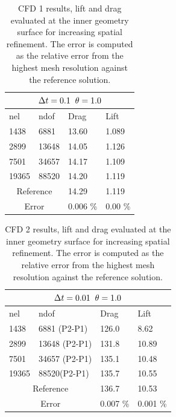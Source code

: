 \begin{table}[h!]
\centering
\label{CFD 1 Results}
\begin{tabular}{ |p{1cm}||p{2.7cm}|p{3.3cm}|p{3.3cm}|}
\hline
  \multicolumn{4}{|c|}{$\Delta t = 0.1 \hspace{2mm} \theta = 1.0$} \\
\hline
nel & ndof & Drag  & Lift \\
\hline
 1438    & 6881   & 13.60 & 1.089  \\
 2899    & 13648  & 14.05 & 1.126 \\
 7501    & 34657  & 14.17   & 1.109 \\
 19365   & 88520  & 14.20 & 1.119 \\
  \hline
  \multicolumn{2}{|c|}{Reference}  & 14.29   & 1.119\\
   \hline
    \multicolumn{2}{|c|}{Error}  & 0.006 \%   & 0.00 \%\\
   \hline
\end{tabular}
\caption{CFD 1 results, lift and drag evaluated at the inner geometry surface for increasing spatial refinement. The error is computed as the relative error from the highest mesh resolution against the reference solution.}
\end{table}

\newpage

\begin{table}[h!]
\centering
\label{CFD-2 Results}
\begin{tabular}{ |p{1cm}||p{2.7cm}|p{3.3cm}|p{3.3cm}|}
 \hline
  \multicolumn{4}{|c|}{$\Delta t = 0.01 \hspace{2mm} \theta = 1.0$} \\
   \hline
nel & ndof & Drag  & Lift \\
\hline
 1438    & 6881 (P2-P1)  & 126.0 &  8.62 \\
 2899    & 13648  (P2-P1)& 131.8 & 10.89  \\
 7501    & 34657 (P2-P1) & 135.1 & 10.48  \\
 19365   & 88520(P2-P1)  & 135.7 & 10.55  \\
 \hline
  \multicolumn{2}{|c|}{Reference}  & 136.7   & 10.53\\
   \hline
    \multicolumn{2}{|c|}{Error}  & 0.007 \%   & 0.001 \%\\
   \hline
\end{tabular}
\caption{CFD 2 results, lift and drag evaluated at the inner geometry surface for increasing spatial refinement. The error is computed as the relative error from the highest mesh resolution against the reference solution.}
\end{table}

